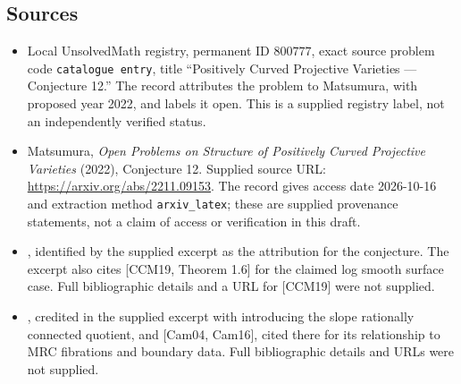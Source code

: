 \documentclass[11pt]{article}
\begin{document}
\subsection{Sources}
\begin{itemize}
\item Local UnsolvedMath registry, permanent ID \(800777\), exact source problem code \texttt{catalogue entry}, title ``Positively Curved Projective Varieties --- Conjecture 12.'' The record attributes the problem to Matsumura, with proposed year 2022, and labels it open. This is a supplied registry label, not an independently verified status.
\item Matsumura, \emph{Open Problems on Structure of Positively Curved Projective Varieties} (2022), Conjecture 12. Supplied source URL: \url{https://arxiv.org/abs/2211.09153}. The record gives access date 2026-10-16 and extraction method \texttt{arxiv\_latex}; these are supplied provenance statements, not a claim of access or verification in this draft.
\item [CCM19, Conjecture 1.5], identified by the supplied excerpt as the attribution for the conjecture. The excerpt also cites [CCM19, Theorem 1.6] for the claimed log smooth surface case. Full bibliographic details and a URL for [CCM19] were not supplied.
\item [Cam16], credited in the supplied excerpt with introducing the slope rationally connected quotient, and [Cam04, Cam16], cited there for its relationship to MRC fibrations and boundary data. Full bibliographic details and URLs were not supplied.
\end{itemize}
\end{document}
